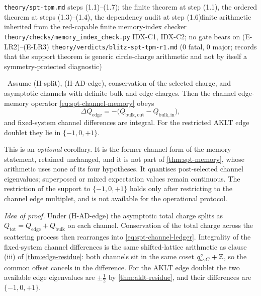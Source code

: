 %
{\texttt{theory/spt-tpm.md} steps (1.1)--(1.7); the finite theorem at step
(1.1), the ordered theorem at steps (1.3)--(1.4), the dependency audit at step
(1.6)}{finite arithmetic inherited from the red-capable finite memory-index
checker \texttt{theory/checks/memory\_index\_check.py} IDX-C1, IDX-C2;
no gate bears on (E-LR2)--(E-LR3)}%
{\texttt{theory/verdicts/blitz-spt-tpm-r1.md} (0 fatal, 0 major; records that
the support theorem is generic circle-charge arithmetic and not by itself a
symmetry-protected diagnostic)}

\begin{corollary}\label{thm:spt-channel}
\statusProvedConditional\ Assume (H-split), (H-AD-edge), conservation of the
selected charge, and asymptotic channels with definite bulk and edge charges.
Then the channel edge-memory operator \eqref{eq:spt-channel-memory} obeys
\begin{equation}
  \Delta Q_{\mathrm{edge}}
   = -\bigl(Q_{\mathrm{bulk,out}}-Q_{\mathrm{bulk,in}}\bigr),
  \label{eq:spt-channel-ledger}
\end{equation}
and fixed-system channel differences are integral. For the restricted AKLT
edge doublet they lie in $\{-1,0,+1\}$.
\end{corollary}

\begin{scope}
This is an \emph{optional} corollary. It is the former channel form of the
memory statement, retained unchanged, and it is not part of
\cref{thm:spt-memory}, whose arithmetic uses none of its four hypotheses. It
quantises post-selected channel eigenvalues; superposed or mixed expectation
values remain continuous. The restriction of the support to $\{-1,0,+1\}$
holds only after restricting to the channel edge multiplet, and is not
available for the operational protocol.
\end{scope}

\emph{Idea of proof.} Under (H-AD-edge) the asymptotic total charge splits as
$Q_{\mathrm{tot}}=Q_{\mathrm{edge}}+Q_{\mathrm{bulk}}$ on each channel.
Conservation of the total charge across the scattering process then rearranges
into \eqref{eq:spt-channel-ledger}. Integrality of the fixed-system channel
differences is the same shifted-lattice arithmetic as clause (iii) of
\cref{thm:edge-residue}: both channels sit in the same coset
$q^{\circ}_{\omega,C}+\mathbb{Z}$, so the common offset cancels in the difference. For
the AKLT edge doublet the two available edge eigenvalues are $\pm\tfrac12$ by
\cref{thm:aklt-residue}, and their differences are $\{-1,0,+1\}$.

